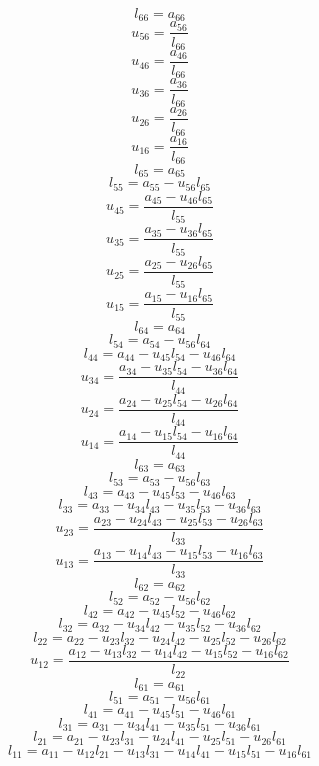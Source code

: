 \documentclass[10pt,a4paper,dvipdfmx]{article}
\begin{document}
\begin{multicols}{2}
\vfill\null
\columnbreak
$$ l_{{6}{6}} = a_{{6}{6}} $$
$$ u_{{5}{6}} = \dfrac{a_{{5}{6}}}{l_{{6}{6}}} $$
$$ u_{{4}{6}} = \dfrac{a_{{4}{6}}}{l_{{6}{6}}} $$
$$ u_{{3}{6}} = \dfrac{a_{{3}{6}}}{l_{{6}{6}}} $$
$$ u_{{2}{6}} = \dfrac{a_{{2}{6}}}{l_{{6}{6}}} $$
$$ u_{{1}{6}} = \dfrac{a_{{1}{6}}}{l_{{6}{6}}} $$
$$ l_{{6}{5}} = a_{{6}{5}} $$
$$ l_{{5}{5}} = a_{{5}{5}}- u_{{5}{6}} l_{{6}{5}} $$
$$ u_{{4}{5}} = \dfrac{a_{{4}{5}}- u_{{4}{6}} l_{{6}{5}}}{l_{{5}{5}}} $$
$$ u_{{3}{5}} = \dfrac{a_{{3}{5}}- u_{{3}{6}} l_{{6}{5}}}{l_{{5}{5}}} $$
$$ u_{{2}{5}} = \dfrac{a_{{2}{5}}- u_{{2}{6}} l_{{6}{5}}}{l_{{5}{5}}} $$
$$ u_{{1}{5}} = \dfrac{a_{{1}{5}}- u_{{1}{6}} l_{{6}{5}}}{l_{{5}{5}}} $$
$$ l_{{6}{4}} = a_{{6}{4}} $$
$$ l_{{5}{4}} = a_{{5}{4}}- u_{{5}{6}} l_{{6}{4}} $$
$$ l_{{4}{4}} = a_{{4}{4}}- u_{{4}{5}} l_{{5}{4}}- u_{{4}{6}} l_{{6}{4}} $$
$$ u_{{3}{4}} = \dfrac{a_{{3}{4}}- u_{{3}{5}} l_{{5}{4}}- u_{{3}{6}} l_{{6}{4}}}{l_{{4}{4}}} $$
$$ u_{{2}{4}} = \dfrac{a_{{2}{4}}- u_{{2}{5}} l_{{5}{4}}- u_{{2}{6}} l_{{6}{4}}}{l_{{4}{4}}} $$
$$ u_{{1}{4}} = \dfrac{a_{{1}{4}}- u_{{1}{5}} l_{{5}{4}}- u_{{1}{6}} l_{{6}{4}}}{l_{{4}{4}}} $$
$$ l_{{6}{3}} = a_{{6}{3}} $$
$$ l_{{5}{3}} = a_{{5}{3}}- u_{{5}{6}} l_{{6}{3}} $$
$$ l_{{4}{3}} = a_{{4}{3}}- u_{{4}{5}} l_{{5}{3}}- u_{{4}{6}} l_{{6}{3}} $$
$$ l_{{3}{3}} = a_{{3}{3}}- u_{{3}{4}} l_{{4}{3}}- u_{{3}{5}} l_{{5}{3}}- u_{{3}{6}} l_{{6}{3}} $$
$$ u_{{2}{3}} = \dfrac{a_{{2}{3}}- u_{{2}{4}} l_{{4}{3}}- u_{{2}{5}} l_{{5}{3}}- u_{{2}{6}} l_{{6}{3}}}{l_{{3}{3}}} $$
$$ u_{{1}{3}} = \dfrac{a_{{1}{3}}- u_{{1}{4}} l_{{4}{3}}- u_{{1}{5}} l_{{5}{3}}- u_{{1}{6}} l_{{6}{3}}}{l_{{3}{3}}} $$
$$ l_{{6}{2}} = a_{{6}{2}} $$
$$ l_{{5}{2}} = a_{{5}{2}}- u_{{5}{6}} l_{{6}{2}} $$
$$ l_{{4}{2}} = a_{{4}{2}}- u_{{4}{5}} l_{{5}{2}}- u_{{4}{6}} l_{{6}{2}} $$
$$ l_{{3}{2}} = a_{{3}{2}}- u_{{3}{4}} l_{{4}{2}}- u_{{3}{5}} l_{{5}{2}}- u_{{3}{6}} l_{{6}{2}} $$
$$ l_{{2}{2}} = a_{{2}{2}}- u_{{2}{3}} l_{{3}{2}}- u_{{2}{4}} l_{{4}{2}}- u_{{2}{5}} l_{{5}{2}}- u_{{2}{6}} l_{{6}{2}} $$
$$ u_{{1}{2}} = \dfrac{a_{{1}{2}}- u_{{1}{3}} l_{{3}{2}}- u_{{1}{4}} l_{{4}{2}}- u_{{1}{5}} l_{{5}{2}}- u_{{1}{6}} l_{{6}{2}}}{l_{{2}{2}}} $$
$$ l_{{6}{1}} = a_{{6}{1}} $$
$$ l_{{5}{1}} = a_{{5}{1}}- u_{{5}{6}} l_{{6}{1}} $$
$$ l_{{4}{1}} = a_{{4}{1}}- u_{{4}{5}} l_{{5}{1}}- u_{{4}{6}} l_{{6}{1}} $$
$$ l_{{3}{1}} = a_{{3}{1}}- u_{{3}{4}} l_{{4}{1}}- u_{{3}{5}} l_{{5}{1}}- u_{{3}{6}} l_{{6}{1}} $$
$$ l_{{2}{1}} = a_{{2}{1}}- u_{{2}{3}} l_{{3}{1}}- u_{{2}{4}} l_{{4}{1}}- u_{{2}{5}} l_{{5}{1}}- u_{{2}{6}} l_{{6}{1}} $$
$$ l_{{1}{1}} = a_{{1}{1}}- u_{{1}{2}} l_{{2}{1}}- u_{{1}{3}} l_{{3}{1}}- u_{{1}{4}} l_{{4}{1}}- u_{{1}{5}} l_{{5}{1}}- u_{{1}{6}} l_{{6}{1}} $$
\end{multicols}
\end{document}
